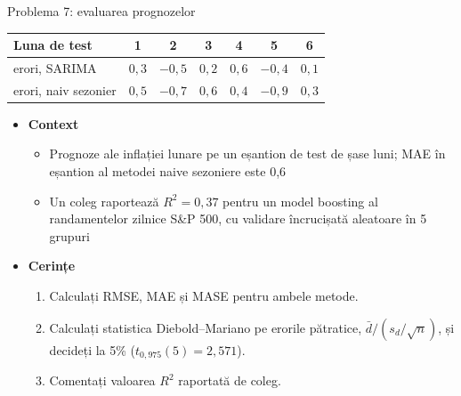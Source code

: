 \begin{frame}{Problema 7: evaluarea prognozelor}
\itemsize{\footnotesize}
\begin{center}
\scriptsize
\begin{tabular}{lcccccc}
\toprule
\textbf{Luna de test} & 1 & 2 & 3 & 4 & 5 & 6 \\
\midrule
erori, SARIMA & $0{,}3$ & $-0{,}5$ & $0{,}2$ & $0{,}6$ & $-0{,}4$ & $0{,}1$ \\
erori, naiv sezonier & $0{,}5$ & $-0{,}7$ & $0{,}6$ & $0{,}4$ & $-0{,}9$ & $0{,}3$ \\
\bottomrule
\end{tabular}
\end{center}
\begin{itemize}
    \item \textbf{Context}
    \begin{itemize}
        \item Prognoze ale inflației lunare pe un eșantion de test de șase luni; MAE în eșantion al metodei naive sezoniere este 0,6
        \item Un coleg raportează $R^2 = 0{,}37$ pentru un model boosting al randamentelor zilnice S\&P 500, cu validare încrucișată aleatoare în 5 grupuri
    \end{itemize}
    \item \textbf{Cerințe}
\begin{enumerate}
    \item Calculați RMSE, MAE și MASE pentru ambele metode.
    \item Calculați statistica Diebold--Mariano pe erorile pătratice, $\bar d/(s_d/\sqrt{n})$, și decideți la 5\% ($t_{0,975}(5) = 2{,}571$).
    \item Comentați valoarea $R^2$ raportată de coleg.
\end{enumerate}
\end{itemize}
\end{frame}

